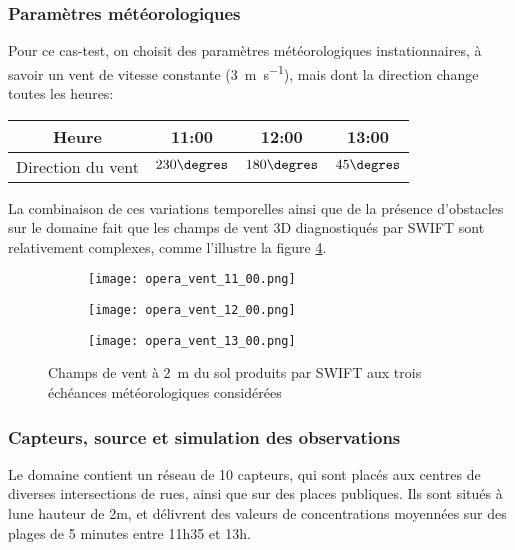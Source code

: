\subsubsection{Paramètres météorologiques}
Pour ce cas-test, on choisit des paramètres météorologiques instationnaires, à savoir un vent de vitesse constante (\SI{3}{\meter \per \second}), mais dont la direction change toutes les heures:

\begin{center}
	\begin{tabular}{cccc}
		\centering
		Heure & 11:00 &  12:00 &  13:00\\ 
		\hline
		Direction du vent & $230\degres$ & $180\degres$ & $45\degres$
	\end{tabular} 
\end{center}

La combinaison de ces variations temporelles ainsi que de la présence d'obstacles sur le domaine fait que les champs de vent 3D diagnostiqués par SWIFT sont relativement complexes, comme l'illustre la figure \ref{fig_opera_vent}.

\begin{figure}[h!]
	\centering
	\begin{subfigure}[t]{0.5\textwidth}
		\centering
		\texttt{[image: opera\_vent\_11\_00.png]}
		\caption{}
		\label{opera_vent_11_00}
	\end{subfigure}%
	\begin{subfigure}[t]{0.5\textwidth}
		\centering
		\texttt{[image: opera\_vent\_12\_00.png]}
		\caption{}
		\label{opera_vent_12_00}
	\end{subfigure}
	\begin{subfigure}[t]{0.5\textwidth}
		\centering
		\texttt{[image: opera\_vent\_13\_00.png]}
		\caption{}
		\label{opera_vent_13_00}
	\end{subfigure}%
	\caption{Champs de vent à \SI{2}{\meter} du sol produits par SWIFT aux trois échéances météorologiques considérées}
	\label{fig_opera_vent}
	
\end{figure}



\subsubsection{Capteurs, source et simulation des observations}
Le domaine contient un réseau de 10 capteurs, qui sont placés aux centres de diverses intersections de rues, ainsi que sur des places publiques. Ils sont situés à lune hauteur de 2m, et délivrent des valeurs de concentrations moyennées sur des plages de 5 minutes entre 11h35 et 13h.

